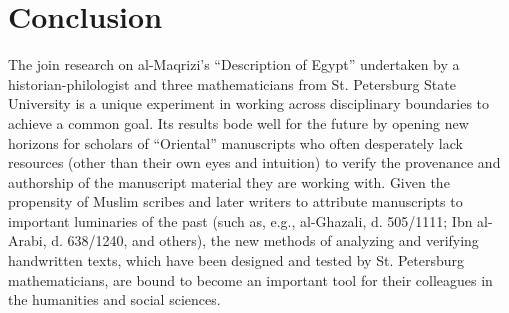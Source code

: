 \documentclass[conference,a4paper,twocolumn]{IEEEtran}
\begin{document}
\section{Conclusion}

The join research on al-Maqrizi’s ``Description of Egypt'' undertaken by a historian-philologist and three mathematicians from St. Petersburg State University is a unique experiment in working across disciplinary boundaries to achieve a common goal. Its results bode well for the future by opening new horizons for scholars of ``Oriental'' manuscripts who often desperately lack resources (other than their own eyes and intuition) to verify the provenance and authorship of the manuscript material they are working with. Given the propensity of Muslim scribes and later writers to attribute manuscripts to important luminaries of the past (such as, e.g., al-Ghazali, d. 505/1111; Ibn al-Arabi, d. 638/1240, and others), the new methods of analyzing and verifying handwritten texts, which have been designed and tested by St. Petersburg mathematicians, are bound to become an important tool for their colleagues in the humanities and social sciences.


%
%
%
\end{document}
